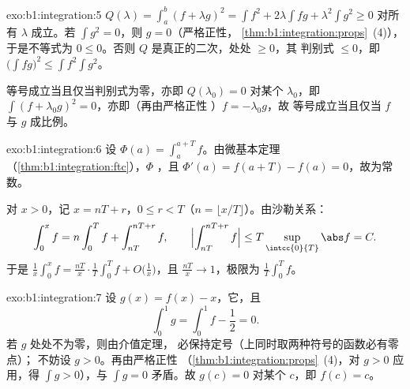\begin{solution}{exo:b1:integration:5}
$Q(\lambda) = \int_a^b (f + \lambda g)^2 = \int f^2 + 2\lambda \int
fg + \lambda^2 \int g^2 \geq 0$ 对所有 $\lambda$ 成立。若 $\int g^2 =
0$，则 $g = 0$（严格正性，
\cref{thm:b1:integration:props}~(4)），于是不等式为 $0 \leq
0$。否则 $Q$ 是真正的二次，处处 $\geq 0$，其
判别式 $\leq 0$，即 $\bigl(\int fg\bigr)^2 \leq \int
f^2 \int g^2$。

等号成立当且仅当判别式为零，亦即 $Q(\lambda_0) = 0$ 对某个
$\lambda_0$，即 $\int (f + \lambda_0 g)^2 = 0$，亦即（再由严格正性
）$f = -\lambda_0 g$，故
等号成立当且仅当 $f$ 与 $g$ 成比例。
\end{solution}

\begin{solution}{exo:b1:integration:6}
设 $\Phi(a) = \int_a^{a+T} f$。由微基本定理
（\cref{thm:b1:integration:ftc}），$\Phi$ ，且
$\Phi'(a) = f(a + T) - f(a) = 0$，故为常数。

对 $x > 0$，记 $x = nT + r$，$0 \leq r < T$（$n = \lfloor x/T
\rfloor$）。由沙勒关系：
\[
\int_0^x f = n \int_0^T f + \int_{nT}^{nT + r} f,
\qquad
\Bigl| \int_{nT}^{nT+r} f \Bigr| \leq T \sup_{\intcc{0}{T}} \abs f
= C .
\]
于是 $\frac 1x \int_0^x f = \frac{nT}{x}\cdot\frac 1T \int_0^T f +
O\bigl(\frac 1x\bigr)$，且 $\frac{nT}{x} \to 1$，极限为
$\frac1T \int_0^T f$。
\end{solution}

\begin{solution}{exo:b1:integration:7}
设 $g(x) = f(x) - x$，它，且
\[
\int_0^1 g = \int_0^1 f - \frac12 = 0 .
\]
若 $g$ 处处不为零，则由介值定理，
必保持定号（上同时取两种符号的函数必有零点）；
不妨设 $g > 0$。再由严格正性
（\cref{thm:b1:integration:props}~(4)，对 $g > 0$ 应用，得
$\int g > 0$），与 $\int g = 0$ 矛盾。故 $g(c) = 0$ 对某个
$c$，即 $f(c) = c$。
\end{solution}

